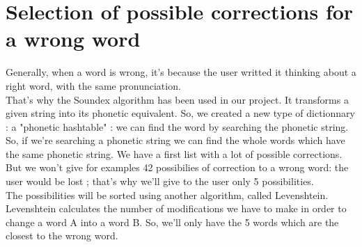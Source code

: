 \section{Selection of possible corrections for a wrong word}
Generally, when a word is wrong, it's because the user writted it thinking about a right word, with the same pronunciation.\\
That's why the Soundex algorithm has been used in our project. It transforms a given string into its phonetic equivalent.
So, we created a new type of dictionnary : a "phonetic hashtable" : we can find the word by searching the phonetic string.
So, if we're searching a phonetic string we can find the whole words which have the same phonetic string.
We have a first list with a lot of possible corrections.\\
But we won't give for examples 42 possibilies of correction to a wrong word: the user would be lost ; that's why we'll give
to the user only 5 possibilities.\\
The possibilities will be sorted using another algorithm, called Levenshtein.
Levenshtein calculates the number of modifications we have to make in order to change a word A into a word B.
So, we'll only have the 5 words which are the closest to the wrong word. 
